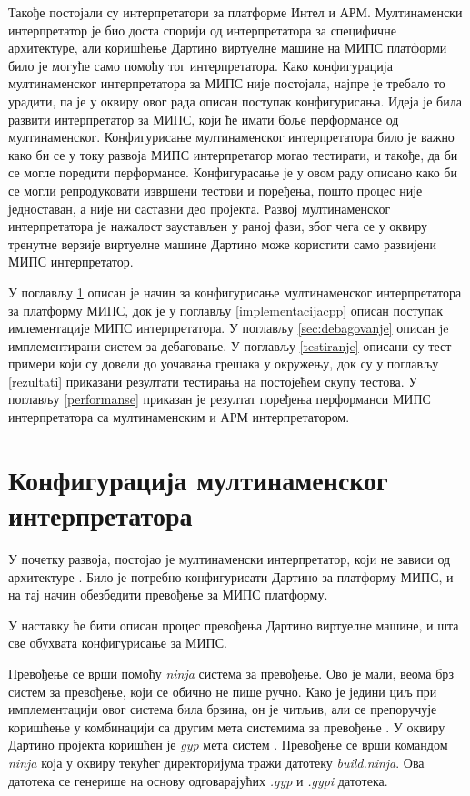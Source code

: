 \documentclass[12pt,oneside]{memoir}
\begin{document}
Такође постојали су интерпретатори за платформе Интел и АРМ. Мултинаменски интерпретатор је био доста спорији од интерпретатора за специфичне архитектуре, али коришћење Дартино виртуелне машине на МИПС платформи било је могуће само помоћу тог интерпретатора. Како конфигурација мултинаменског интерпретатора за МИПС није постојала, најпре је требало то урадити, па је у оквиру овог рада описан поступак конфигурисања. Идеја је била развити интерпретатор за МИПС, који ће имати боље перформансе од мултинаменског. Конфигурисање мултинаменског интерпретатора било је важно како би се у току развоја МИПС интерпретатор могао тестирати, и такође, да би се могле поредити перформансе. Конфигурасање је у овом раду описано како би се могли репродуковати извршени тестови и поређења, пошто процес није једноставан, а није ни саставни део пројекта. Развој мултинаменског интерпретатора је нажалост заустављен у раној фази, због чега се у оквиру тренутне верзије виртуелне машине Дартино може користити само развијени МИПС интерпретатор. 

У поглављу \ref{konfigurisanje} описан је начин за конфигурисање мултинаменског интерпретатора за платформу МИПС, док је у поглављу \ref{implementacijacpp} описан поступак имлементације МИПС интерпретатора. У поглављу \ref{sec:debagovanje} описан je имплементирани систем за дебаговање. У поглављу \ref{testiranje} описани су тест примери који су довели до уочавања грешака у окружењу, док су у поглављу \ref{rezultati} приказани резултати тестирања на постојећем скупу тестова. У поглављу \ref{performanse} приказан је резултат поређења перформанси МИПС интерпретатора са мултинаменским и АРМ интерпретатором.

\section{Конфигурација мултинаменског интерпретатора}
\label{konfigurisanje}
У почетку развоја, постојао је мултинаменски интерпретатор, који не зависи од архитектуре \cite{interpreterMips1}. Било је потребно конфигурисати Дартино за платформу МИПС, и на тај начин обезбедити превођење за МИПС платформу. 

У наставку ће бити описан процес превођења Дартино виртуелне машине, и шта све обухвата конфигурисање за МИПС.

Превођење се врши помоћу \textit{ninja} система за превођење. Ово је мали, веома брз систем за превођење, који се обично не пише ручно. Како је једини циљ при имплементацији овог система била брзина, он је читљив, али се препоручује коришћење у комбинацији са другим мета системима за превођење \cite{ninja}. У оквиру Дартино пројекта коришћен је \textit{gyp} мета систем \cite{gyp}. Превођење се врши командом \textit{ninja} која у оквиру текућег директоријума тражи датотеку \textit{build.ninja}. Ова датотека се генерише на основу одговарајућих \textit{.gyp} и \textit{.gypi} датотека. 
\end{document}
